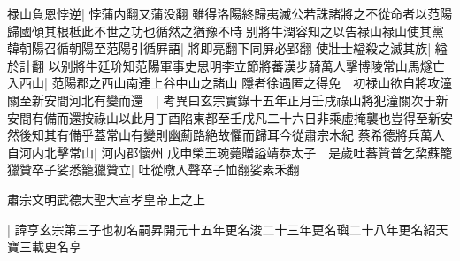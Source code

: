 禄山負恩悖逆|{
	悖蒲内翻又蒲没翻}
雖得洛陽終歸夷滅公若誅諸將之不從命者以范陽歸國傾其根柢此不世之功也循然之猶豫不時别將牛潤容知之以告禄山禄山使其黨韓朝陽召循朝陽至范陽引循屛語|{
	將即亮翻下同屏必郢翻}
使壯士縊殺之滅其族|{
	縊於計翻}
以别將牛廷玠知范陽軍事史思明李立節將蕃漢步騎萬人擊博陵常山馬燧亡入西山|{
	范陽郡之西山南連上谷中山之諸山}
隱者徐遇匿之得免　初禄山欲自將攻潼關至新安間河北有變而還　|{
	考異曰玄宗實錄十五年正月壬戌祿山將犯潼關次于新安間有備而還按祿山以此月丁酉陷東都至壬戌凡二十六日非乘虛掩襲也豈得至新安然後知其有備乎蓋常山有變則幽薊路絶故懼而歸耳今從肅宗木紀}
蔡希德將兵萬人自河内北擊常山|{
	河内郡懷州}
戊申榮王琬薨贈謚靖恭太子　是歲吐蕃贊普乞棃蘇籠獵贊卒子娑悉籠獵贊立|{
	吐從暾入聲卒子恤翻娑素禾翻}


肅宗文明武德大聖大宣孝皇帝上之上

|{
	諱亨玄宗第三子也初名嗣昇開元十五年更名浚二十三年更名璵二十八年更名紹天寶三載更名亨}


